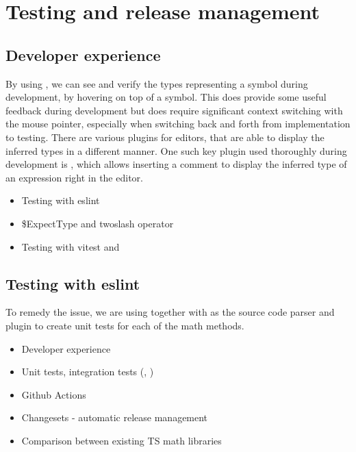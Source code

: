 \chapter{Testing and release management}

\section{Developer experience}

By using , we can see and verify the types representing a symbol during development, by hovering on top of a symbol. This does provide some useful feedback during development but does require significant context switching with the mouse pointer, especially when switching back and forth from implementation to testing. There are various plugins for editors, that are able to display the inferred types in a different manner. One such key plugin used thoroughly during development is  \cite{theroxVscodetwoslashqueries2023}, which allows inserting a  comment to display the inferred type of an expression right in the editor.


\begin{itemize}
  \item Testing with eslint
  \item \$ExpectType and twoslash operator 
  \item Testing with vitest and 
\end{itemize}

\section{Testing with eslint}


To remedy the issue, we are using  together with  as the source code parser and  plugin to create unit tests for each of the math methods.

\begin{itemize}
  \item Developer experience
  \item Unit tests, integration tests (, )
  \item Github Actions
  \item Changesets - automatic release management
  \item Comparison between existing TS math libraries
\end{itemize}